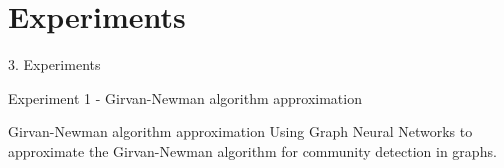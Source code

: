 \documentclass[xcolor=table]{beamer}
\begin{document}




\section{Experiments}
\begin{frame}{ }
\huge{3. Experiments}
\end{frame}














\begin{frame}{Experiment 1 - Girvan-Newman algorithm approximation }{}

\begin{block}{Girvan-Newman algorithm approximation}{
       Using Graph Neural Networks to approximate the Girvan-Newman algorithm for community detection in graphs.
    }\end{block}


\end{frame}
\end{document}
